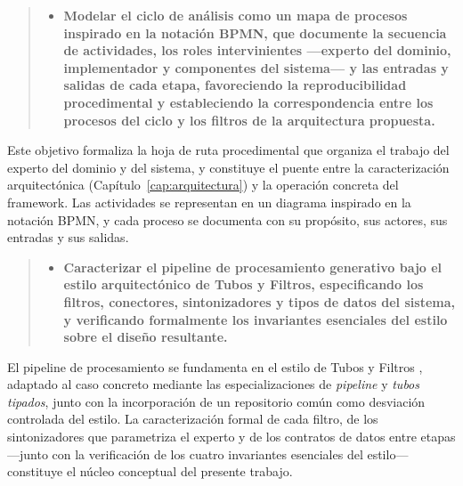 \documentclass[12pt]{report}
\begin{document}
\vspace{0.3 cm}

\begin{quote}
  \begin{itemize}
    \item [OE2:] \textbf{Modelar el ciclo de análisis como un mapa de procesos inspirado en la notación BPMN, que documente la secuencia de actividades, los roles intervinientes ---experto del dominio, implementador y componentes del sistema--- y las entradas y salidas de cada etapa, favoreciendo la reproducibilidad procedimental y estableciendo la correspondencia entre los procesos del ciclo y los filtros de la arquitectura propuesta.}
  \end{itemize}
\end{quote}

\vspace{0.3 cm}

Este objetivo formaliza la hoja de ruta procedimental que organiza el trabajo del experto del dominio y del sistema, y constituye el puente entre la caracterización arquitectónica (Capítulo~\ref{cap:arquitectura}) y la operación concreta del framework. Las actividades se representan en un diagrama inspirado en la notación BPMN, y cada proceso se documenta con su propósito, sus actores, sus entradas y sus salidas.

\vspace{0.3 cm}

\begin{quote}
  \begin{itemize}
    \item [OE3:] \textbf{Caracterizar el pipeline de procesamiento generativo bajo el estilo arquitectónico de Tubos y Filtros, especificando los filtros, conectores, sintonizadores y tipos de datos del sistema, y verificando formalmente los invariantes esenciales del estilo sobre el diseño resultante.}
  \end{itemize}
\end{quote}

\vspace{0.3 cm}

El pipeline de procesamiento se fundamenta en el estilo de Tubos y Filtros \citep{garlanshaw:1994, shawgarlan:1996}, adaptado al caso concreto mediante las especializaciones de \textit{pipeline} y \textit{tubos tipados}, junto con la incorporación de un repositorio común como desviación controlada del estilo. La caracterización formal de cada filtro, de los sintonizadores que parametriza el experto y de los contratos de datos entre etapas ---junto con la verificación de los cuatro invariantes esenciales del estilo--- constituye el núcleo conceptual del presente trabajo.
\end{document}
